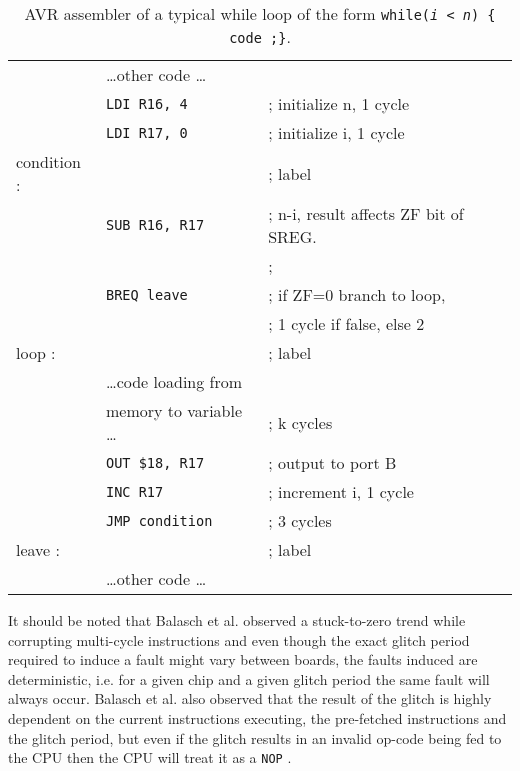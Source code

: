\begin{table}
\caption{\footnotesize AVR assembler of  a typical while loop of the form \texttt{while(\emph{i < n}) \{ code ;\}}.}
\label{tab:while}
\center
\begin{tabular}{ l l p{3cm} }
& \dots other code \dots & \\
&\texttt{LDI R16, 4 }& ; initialize n, 1 cycle\\
&\texttt{LDI R17, 0 }& ; initialize i, 1 cycle \\
condition : &&  ; label\\
& \texttt{SUB R16, R17 }& ; n-i, result affects ZF bit of SREG.\\
& & ; \\
& \texttt{BREQ leave} & ; if ZF=0 branch to loop,\\
& &  ; 1 cycle if false, else 2\\
loop :  & & ; label\\
& \dots code loading from  &\\
& memory to variable \dots & ; k cycles\\
& \texttt{OUT \$18, R17} & ; output to port B\\
& \texttt{INC R17 }& ; increment i, 1 cycle \\
& \texttt{JMP condition }& ; 3 cycles \\
leave : && ; label \\
& \dots other code \dots & \\
\end{tabular}
\end{table}

It should be noted that Balasch et al. \citep{glitches_paper} observed a stuck-to-zero trend while corrupting multi-cycle instructions and even though the exact glitch period required to induce a fault might vary between boards, the faults  induced are deterministic, i.e. for a given chip and a given glitch period the same fault will always occur. Balasch et al. \citep{glitches_paper} also observed that the result of the glitch is highly dependent on the current instructions executing, the pre-fetched instructions and the glitch period, but even if the glitch results in an invalid op-code being fed to the CPU then the CPU will treat it as a \texttt{NOP} . 